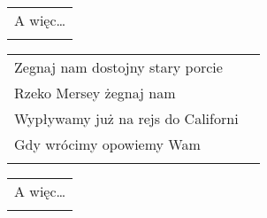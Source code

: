 \documentclass[a5paper]{article}
\begin{document}
\noindent
\begin{tabular}{@{}p{7.50cm}@{}}
A więc… \\ \\
\end{tabular}

\noindent
\begin{tabular}{@{}p{8.50cm}p{3cm}@{}}
Zegnaj nam dostojny stary porcie \\
Rzeko Mersey żegnaj nam \\
Wypływamy już na rejs do Californi \\
Gdy wrócimy opowiemy Wam \\ \\
\end{tabular}

\noindent
\begin{tabular}{@{}p{7.50cm}@{}}
	A więc… \\ \\
\end{tabular}
\end{document}
